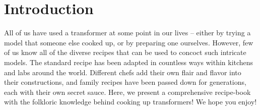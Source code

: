 %
\chapter{Introduction}
%

All of us have used a transformer at some point in our lives -- either by trying a model that someone else cooked up, or by preparing one ourselves. 
However, few of us know all of the diverse recipes that can be used to concoct such intricate models. 
The standard recipe \citep{vaswani-etal-2017-attention} has been adapted in countless ways within kitchens and labs around the world. 
Different chefs add their own flair and flavor into their constructions, and family recipes have been passed down for generations, each with their own secret sauce. 
Here, we present a comprehensive recipe-book with the folkloric knowledge behind cooking up transformers! 
We hope you enjoy!


